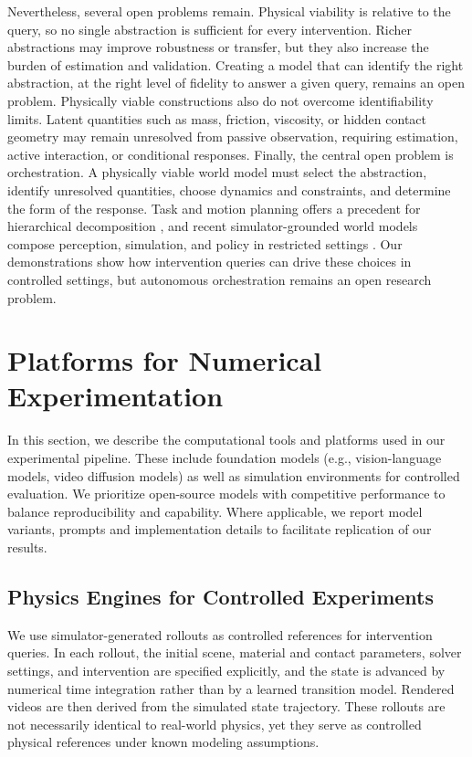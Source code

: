 \documentclass{article}
\begin{document}
Nevertheless, several open problems remain. Physical viability is relative to the query, so no single abstraction is sufficient for every intervention. Richer abstractions may improve robustness or transfer, but they also increase the burden of estimation and validation. Creating a model that can identify the right abstraction, at the right level of fidelity to answer a given query, remains an open problem. Physically viable constructions also do not overcome identifiability limits. Latent quantities such as mass, friction, viscosity, or hidden contact geometry may remain unresolved from passive observation, requiring estimation, active interaction, or conditional responses. Finally, the central open problem is orchestration. A physically viable world model must select the abstraction, identify unresolved quantities, choose dynamics and constraints, and determine the form of the response. Task and motion planning offers a precedent for hierarchical decomposition \citep{garrett2020pddlstream, kaelbling2013integrated}, and recent simulator-grounded world models compose perception, simulation, and policy in restricted settings \citep{barcellona2024dream}. Our demonstrations show how intervention queries can drive these choices in controlled settings, but autonomous orchestration remains an open research problem.




\newpage
\appendix

\section{Platforms for Numerical Experimentation}
In this section, we describe the computational tools and platforms used in our experimental pipeline. These include foundation models (e.g., vision-language models, video diffusion models) as well as simulation environments for controlled evaluation.
We prioritize open-source models with competitive performance to balance reproducibility and capability. Where applicable, we report model variants, prompts and implementation details to facilitate replication of our results.

\subsection{Physics Engines for Controlled Experiments}
\label{sec:simulator_grounded_rollouts}
We use simulator-generated rollouts as controlled references for intervention queries. In each rollout, the initial scene, material and contact parameters, solver settings, and intervention are specified explicitly, and the state is advanced by numerical time integration rather than by a learned transition model. Rendered videos are then derived from the simulated state trajectory. 
These rollouts are not necessarily identical to real-world physics, yet they serve as controlled physical references under known modeling assumptions.
\end{document}
